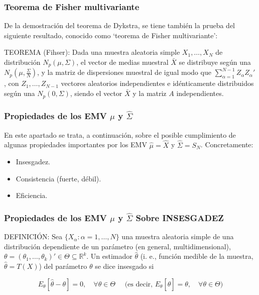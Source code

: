 \documentclass[11pt,a4paper]{article}
\begin{document}
\subsubsection{Teorema de Fisher multivariante}
De la demostración del teorema de Dykstra, se tiene también la prueba del siguiente resultado, conocido como `teorema de Fisher multivariante':

TEOREMA (Fihser): Dada una muestra aleatoria simple $X_{1}, \dots, X_{N}$ de distribución $N_{p}(\mu, \Sigma)$, el vector de medias muestral $\bar{X}$ se distribuye según una $N_{p}(\mu, \frac{\Sigma}{N})$, y la matriz de dispersiones muestral de igual modo que $\sum_{\alpha=1}^{N-1}Z_{\alpha}Z_{\alpha}'$, con $Z_{1}, \dots, Z_{N-1}$ vectores aleatorios independientes e idénticamente distribuidos según una $N_{p}(0, \Sigma)$, siendo el vector $\bar{X}$ y la matriz $A$ independientes.

\subsubsection{Propiedades de los EMV \texorpdfstring{$\hat{\mu}$}) y \texorpdfstring{$\hat{\Sigma}$})}
En este apartado se trata, a continuación, sobre el posible cumplimiento de algunas propiedades importantes por los EMV $\hat{\mu} = \hat{X}$ y $\hat{\Sigma} = S_{N}$. Concretamente:
\begin{itemize}
\item Insesgadez.
\item Consistencia (fuerte, débil).
\item Eficiencia.
\end{itemize}

\subsubsection{Propiedades de los EMV \texorpdfstring{$\hat{\mu}$}) y \texorpdfstring{$\hat{\Sigma}$}) Sobre INSESGADEZ}
DEFINICIÓN: Sea $\{X_{\alpha}: \alpha=1, \ldots, N\}$ una muestra aleatoria simple de una distribución dependiente de un parámetro (en general, multidimensional), $\theta = (\theta_{1}, \ldots, \theta_{k})' \in \Theta \subseteq \mathbb{R}^{k}$. Un estimador $\hat{\theta}$ (i. e., función medible de la muestra, $\hat{\theta} = T(X)$) del parámetro $\theta$ se dice insesgado si

$$E_{\theta}[\hat{\theta}-\theta]=0, \quad \forall \theta \in \Theta \quad \text { (es decir, } E_{\theta}[\hat{\theta}]=\theta, \quad \forall \theta \in \Theta)$$
\end{document}
